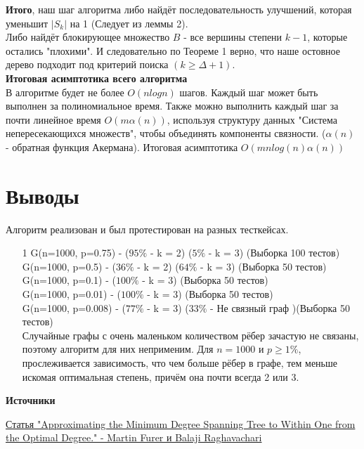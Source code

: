 \documentclass[a4paper, 12pt]{article}
\begin{document}
\textbf{Итого}, наш шаг алгоритма либо найдёт последовательность улучшений, которая уменьшит $|S_k|$ на 1 (Следует из леммы 2).\\
Либо найдёт блокирующее множество $B$ - все вершины степени $k - 1$, которые остались "плохими". И следовательно по Теореме 1 верно, что наше остовное дерево подходит под критерий поиска $(k \geqslant \Delta + 1)$.\\

\textbf{Итоговая асимптотика всего алгоритма}\\
В алгоритме будет не более $O(nlogn)$ шагов. Каждый шаг может быть выполнен за полиномиальное время. Также можно выполнить каждый шаг за почти линейное время $O(m\alpha({n}))$, используя структуру данных "Система непересекающихся множеств", чтобы объединять компоненты связности. ($\alpha(n)$ - обратная функция Акермана). Итоговая асимптотика $O(m n log(n)\alpha(n))$


\section{Выводы}

Алгоритм реализован и был протестирован на разных тесткейсах.

\begin{enumerate}

\item[1] G(n=1000, p=0.75) - ($95\%$ - k = 2) ($5\%$ - k = 3) (Выборка 100 тестов)\\
G(n=1000, p=0.5) - ($36\%$ - k = 2) ($64\%$ - k = 3) (Выборка 50 тестов)\\
G(n=1000, p=0.1) - ($100\%$ - k = 3) (Выборка 50 тестов)\\
G(n=1000, p=0.01) - ($100\%$ - k = 3) (Выборка 50 тестов)\\
G(n=1000, p=0.008) - ($77\%$ - k = 3) ($33\%$ - Не связный граф )(Выборка 50 тестов)\\

Случайные графы с очень маленьком количеством рёбер зачастую не связаны, поэтому алгоритм для них неприменим.
Для $n = 1000$ и $p \geqslant 1\%$, прослеживается зависимость, что чем больше рёбер в графе, тем меньше искомая оптимальная степень, причём она почти всегда 2 или 3.

\end{enumerate}

\textbf{Источники}

\href{https://www.researchgate.net/publication/220779201_Approximating_the_Minimum_Degree_Spanning_Tree_to_Within_One_from_the_Optimal_Degree}{Статья "Approximating the Minimum Degree Spanning Tree to Within One from the Optimal Degree." - Martin Furer и Balaji Raghavachari}
\end{document}

